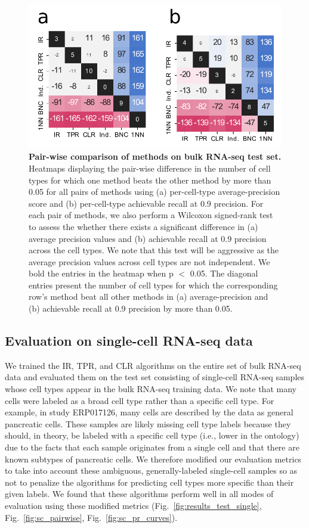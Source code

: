 \begin{figure}[htbp]
    \centerline{\includegraphics[width=13cm]{figures/bulk_test_pairwise_heatmaps.pdf}}
    \caption{\textbf{Pair-wise comparison of methods on bulk RNA-seq test set.} Heatmaps displaying the pair-wise difference in the number of cell types for which one method beats the other method by more than 0.05 for all pairs of methods using (a) per-cell-type average-precision score and (b) per-cell-type achievable recall at 0.9 precision. For each pair of methods, we also perform a Wilcoxon signed-rank test to assess the whether there exists a significant difference in (a) average precision values and (b) achievable recall at 0.9 precision across the cell types.  We note that this test will be aggressive as the average precision values across cell types are not independent. We bold the entries in the heatmap when p $<$ 0.05.  The diagonal entries present the number of cell types for which the corresponding row's method beat all other methods in (a) average-precision and (b) achievable recall at 0.9 precision by more than 0.05.}
    \label{fig:bulk_pairwise}
      \end{figure}

\subsection*{Evaluation on single-cell RNA-seq data}

We trained the IR, TPR, and CLR algorithms on the entire set of bulk RNA-seq data and evaluated them on the test set consisting of \BulkRestrictedSingleCellExperiments{} single-cell RNA-seq samples whose cell types appear in the bulk RNA-seq training data. We note that many cells were labeled as a broad cell type rather than a specific cell type. For example, in study ERP017126, many cells are described by the data as general pancreatic cells. These samples are likely missing cell type labels because they should, in theory, be labeled with a specific cell type (i.e., lower in the ontology) due to the facts that each sample originates from a single cell and that there are known subtypes of pancreatic cells.  We therefore modified our evaluation metrics to take into account these ambiguous, generally-labeled single-cell samples so as not to penalize the algorithms for predicting cell types more specific than their given labels. We found that these algorithms perform well in all modes of evaluation using these modified metrics (Fig.~\ref{fig:results_test_single}, Fig.~\ref{fig:sc_pairwise}, Fig.~\ref{fig:sc_pr_curves}). 

